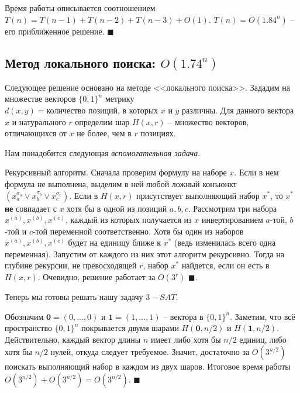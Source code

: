Время работы описывается соотношением $T(n) = T(n-1) + T(n-2) + T(n-3) + O(1)$. $T(n) = O(1.84^n)$ -- его приближенное решение. $\blacksquare$

\needpicture

\subsection{Метод локального поиска: $O(1.74^n)$}
Следующее решение основано на методе <<локального поиска>>. Зададим на множестве векторов $\{0, 1\}^n$ метрику $d(x, y) = \text{количество позиций, в которых } x \text{ и } y \text{ различны}$. Для данного вектора $x$ и натурального $r$ определим шар $H(x, r)$ -- множество векторов, отличающихся от $x$ не более, чем в $r$ позициях.

Нам понадобится следующая \hypertarget{flip20}{\textit{вспомогательная задача}}.


 Рекурсивный алгоритм. Сначала проверим формулу на наборе $x$. Если в нем формула не выполнена, выделим в ней любой ложный конъюнкт $(x_a^{\sigma_a} \lor x_b^{\sigma_b} \lor x_c^{\sigma_c})$. Если в $H(x, r)$ присутствует выполняющий набор $x^*$, то $x^*$ \textbf{не} совпадает с $x$ хотя бы в одной из позиций $a,b,c$. Рассмотрим три набора $x^{(a)}, x^{(b)}, x^{(c)}$, каждый из которых получается из $x$ инвертированием $a$-той, $b$-той и $c$-той переменной соответственно. Хотя бы один из наборов  $x^{(a)}, x^{(b)}, x^{(c)}$ будет на единицу ближе к $x^*$ (ведь изменилась всего одна переменная). Запустим от каждого из них этот алгоритм рекурсивно. Тогда на глубине рекурсии, не превосходящей $r$, набор $x^*$ найдется, если он есть в $H(x, r)$. Очевидно, решение работает за $O(3^r)$ $\blacksquare$.

Теперь мы готовы решать нашу задачу $3-SAT$.


Обозначим $\mathbf 0 = (0, ..., 0)$ и $\mathbf 1 = (1, ..., 1)$ -- вектора в $\{0, 1\}^n$. Заметим, что всё пространство $\{0, 1\}^n$ покрывается двумя шарами $H(\mathbf 0, n/2)$ и $H(\mathbf 1, n/2)$. Действительно, каждый вектор длины $n$ имеет либо хотя бы $n/2$ единиц, либо хотя бы $n/2$ нулей, откуда следует требуемое. Значит, достаточно за $O(3^{n/2})$ поискать выполняющий набор в каждом из двух шаров. Итоговое время работы $O(3^{n/2}) + O(3^{n/2}) = O(3^{n/2})$. $\blacksquare$




